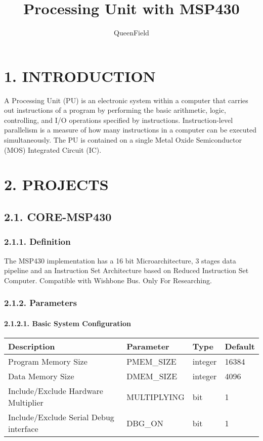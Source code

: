 \documentclass[]{article}
\title{Processing Unit with MSP430}
\author{QueenField}
\date{}
\let\oldparagraph\paragraph
\renewcommand{\paragraph}[1]{\oldparagraph{#1}\mbox{}}
\begin{document}
\maketitle

\section{1. INTRODUCTION}\label{introduction}

A Processing Unit (PU) is an electronic system within a computer that
carries out instructions of a program by performing the basic
arithmetic, logic, controlling, and I/O operations specified by
instructions. Instruction-level parallelism is a measure of how many
instructions in a computer can be executed simultaneously. The PU is
contained on a single Metal Oxide Semiconductor (MOS) Integrated Circuit
(IC).

\section{2. PROJECTS}\label{projects}

\subsection{2.1. CORE-MSP430}\label{core-msp430}

\subsubsection{2.1.1. Definition}\label{definition}

The MSP430 implementation has a 16 bit Microarchitecture, 3 stages data
pipeline and an Instruction Set Architecture based on Reduced
Instruction Set Computer. Compatible with Wishbone Bus. Only For
Researching.

\subsubsection{2.1.2. Parameters}\label{parameters}

\paragraph{2.1.2.1. Basic System
Configuration}\label{basic-system-configuration}

\begin{longtable}[]{@{}llll@{}}
\toprule
Description & Parameter & Type & Default\tabularnewline
\midrule
\endhead
Program Memory Size & PMEM\_SIZE & integer & 16384\tabularnewline
Data Memory Size & DMEM\_SIZE & integer & 4096\tabularnewline
Include/Exclude Hardware Multiplier & MULTIPLYING & bit &
1\tabularnewline
Include/Exclude Serial Debug interface & DBG\_ON & bit &
1\tabularnewline
\bottomrule
\end{longtable}
\end{document}

